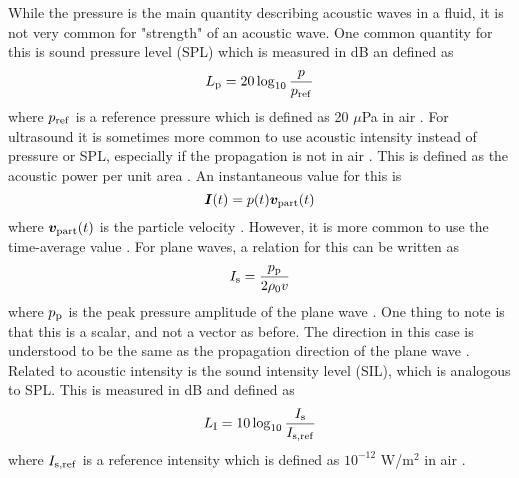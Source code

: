 \documentclass[11pt,twoside]{eitExjobb}
\begin{document}
	While the pressure is the main quantity describing acoustic waves in a fluid, it is not very common for "strength" of an acoustic wave. One common quantity for this is sound pressure level (SPL) which is measured in dB an defined as
	\begin{equation*}
		L_{\mathrm{p}} = 20 \log_{10}{\frac{p}{p_{\mathrm{ref}}}}
	\end{equation*}
	where $p_{\mathrm{ref}}$ is a reference pressure which is defined as 20 $\mu$Pa in air \cite{Rossing2014}. For ultrasound it is sometimes more common to use acoustic intensity instead of pressure or SPL, especially if the propagation is not in air \addref. This is defined as the acoustic power per unit area \cite{Rossing2014}. An instantaneous value for this is
	\begin{equation*}
		\bm{I}(t) = p(t) \bm{v}_{\mathrm{part}}(t)
	\end{equation*}
	where $\bm{v}_{\mathrm{part}}(t)$ is the particle velocity \cite{Rossing2014}. However, it is more common to use the time-average value \cite{Jacobsen1991}. For plane waves, a relation for this can be written as
	\begin{equation*}
		I_{\mathrm{s}} = \frac{p_{\mathrm{p}}}{2\rho_0 v}
	\end{equation*}
	where $p_{\mathrm{p}}$ is the peak pressure amplitude of the plane wave \cite{Rossing2014}. One thing to note is that this is a scalar, and not a vector as before. The direction in this case is understood to be the same as the propagation direction of the plane wave \cite{Rossing2014}. Related to acoustic intensity is the sound intensity level (SIL), which is analogous to SPL. This is measured in dB and defined as
	\begin{equation*}
		L_{\mathrm{I}} = 10 \log_{10}{\frac{I_{\mathrm{s}}}{I_{\mathrm{s,ref}}}}
	\end{equation*}
	where $I_{\mathrm{s,ref}}$ is a reference intensity which is defined as $10^{-12}$ W/m$^2$ in air \cite{Rossing2014}.
	
\end{document}
